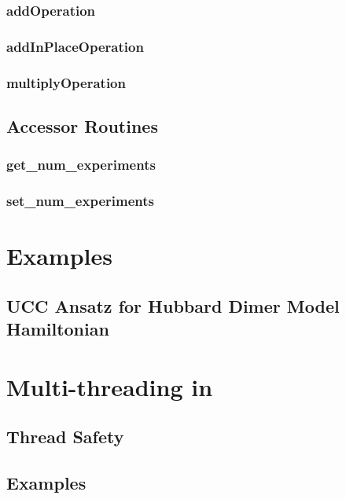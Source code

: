 \documentclass[10pt]{book}
\begin{document}
\subsubsection{\textbf{addOperation}}\label{subsec:addop}


\subsubsection{\textbf{addInPlaceOperation}}\label{subsec:addinplaceop}


\subsubsection{\textbf{multiplyOperation}}\label{subsec:mulop}

 
 
\subsection{Accessor Routines}
\subsubsection{\textbf{get\_num\_experiments}}\label{subsec:getnumexp}


\subsubsection{\textbf{set\_num\_experiments}}\label{subsec:setnumexp}


\clearpage


\section{\qcor Examples}\label{sec:examples}

\subsection{UCC Ansatz for Hubbard Dimer Model Hamiltonian}\label{subsec:hubbard_dimer_ex}


\section{Multi-threading in \qcor}\label{sec:multi}
\subsection{Thread Safety}
\subsection{Examples}

\clearpage



\end{document}
